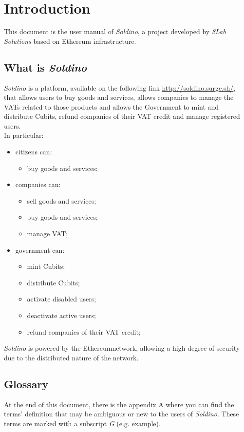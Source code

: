 \section{Introduction} 
This document is the user manual of \textit{Soldino}, a project developed by 
	\textit{8Lab Solutions} based on Ethereum infrastructure. 
	\subsection{What is \textit{Soldino}}
	\textit{Soldino} is a platform, available on the following link \url{http://soldino.surge.sh/}, 
	that allows users to buy goods and services, allows companies to manage the 
	VATs related to those products and allows the Government to mint and 
	distribute Cubits\glo, refund companies of their VAT credit and manage 
	registered users.\\
	In particular:
	\begin{itemize}
		\item citizens can:
		\begin{itemize}
			\item  buy goods and services;
		\end{itemize}
		\item companies can:
		\begin{itemize}
			\item sell goods and services;
			\item buy goods and services;
			\item manage VAT;
		\end{itemize}
		\item government can:
		\begin{itemize}
			\item mint Cubits\glo;
			\item distribute Cubits\glo;
			\item activate disabled users;
			\item deactivate active users;
			\item refund companies of their VAT credit;
		\end{itemize}
	\end{itemize}
	\textit{Soldino} is powered by the Ethereum\glosp network, allowing a high
	degree of security due to the distributed nature of the network.
	\subsection{Glossary}
	At the end of this document, there is the appendix A where you can find 
	the terms' definition that may be ambiguous or new to the users of 
	\textit{Soldino}. These terms are marked with a subscript \textit{G} 
	(e.g. example\glo).
